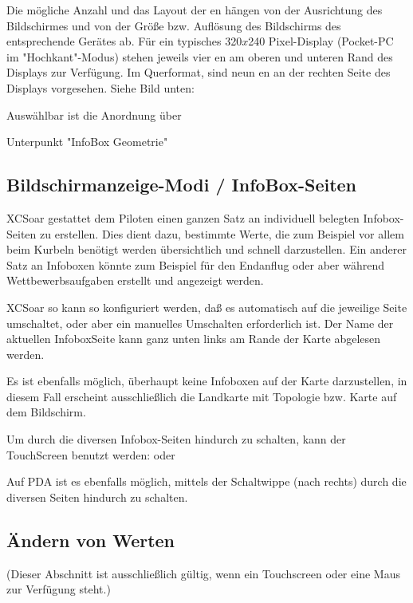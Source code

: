 Die mögliche Anzahl und das Layout der {\InfoBox}en  hängen von der Ausrichtung des Bildschirmes und von der Größe bzw. Auflösung des Bildschirms des entsprechende Gerätes ab. Für ein typisches 320$x$240 Pixel-Display (Pocket-\textsf{PC} im "Hochkant"-Modus) stehen jeweils vier {\InfoBox}en am oberen und unteren Rand des Displays zur Verfügung.
Im Querformat, sind neun {\InfoBox}en an der rechten Seite des Displays vorgesehen. Siehe Bild unten:

Auswählbar ist die Anordnung über
\begin{quote} \blink{}\blink%
\blink{}
\end{quote} Unterpunkt  "InfoBox Geometrie"

\subsection*{Bildschirmanzeige-Modi / InfoBox-Seiten}

\textsf{XCSoar} gestattet dem Piloten einen ganzen Satz an individuell belegten Infobox-Seiten zu erstellen.
Dies dient dazu, bestimmte Werte, die zum Beispiel vor allem beim Kurbeln  benötigt werden übersichtlich und schnell darzustellen.
Ein anderer Satz an Infoboxen könnte zum Beispiel für den Endanflug oder aber während Wettbewerbsaufgaben erstellt und angezeigt werden.

\textsf{XCSoar} so kann so konfiguriert werden, daß es automatisch auf die jeweilige Seite umschaltet, oder aber ein manuelles Umschalten erforderlich ist. Der Name der aktuellen InfoboxSeite kann ganz unten links am Rande der Karte abgelesen werden.

Es ist ebenfalls möglich, überhaupt keine Infoboxen auf der Karte darzustellen, in diesem Fall erscheint ausschließlich die Landkarte mit Topologie bzw. Karte auf dem Bildschirm.

Um durch die diversen Infobox-Seiten hindurch zu schalten, kann der TouchScreen benutzt werden:
 oder 

Auf PDA ist es ebenfalls möglich,  mittels der Schaltwippe  (nach rechts) durch die diversen Seiten hindurch zu schalten.

\subsection*{Ändern von  {\InfoBox} Werten}
(Dieser Abschnitt ist ausschließlich gültig, wenn ein Touchscreen oder eine Maus zur Verfügung steht.)

